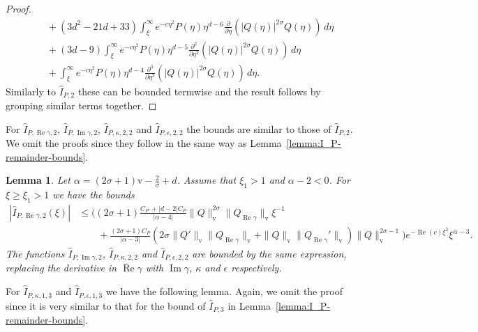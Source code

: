 \documentclass[11pt]{article}
\DeclareMathOperator{\real}{Re}
\DeclareMathOperator{\imag}{Im}
\newcommand{\normv}{\mathrm{v}}
\newtheorem{lemma}[definition]{Lemma}
\begin{document}
\begin{proof}
\begin{align*}
    &\quad + (3d^{2} - 21d + 33)\int_{\xi}^{\infty}e^{-c\eta^{2}}
      P(\eta)\eta^{d - 6}\frac{\partial}{\partial \eta}\left(|Q(\eta)|^{2\sigma}Q(\eta)\right)
      \,d\eta\\
    &\quad + (3d - 9)\int_{\xi}^{\infty}e^{-c\eta^{2}}
      P(\eta)\eta^{d - 5}\frac{\partial^{2}}{\partial \eta^{2}}\left(|Q(\eta)|^{2\sigma}Q(\eta)\right)
      \,d\eta\\
    &\quad + \int_{\xi}^{\infty}e^{-c\eta^{2}}
      P(\eta)\eta^{d - 4}\frac{\partial^{3}}{\partial \eta^{3}}\left(|Q(\eta)|^{2\sigma}Q(\eta)\right)
      \,d\eta.
  \end{align*}
  Similarly to \(\hat{I}_{P,2}\) these can be bounded termwise and the
  result follows by grouping similar terms together.
\end{proof}

For \(\hat{I}_{P,\real\gamma,2}\), \(\hat{I}_{P,\imag\gamma,2}\),
\(\hat{I}_{P,\kappa,2,2}\) and \(\hat{I}_{P,\epsilon,2,2}\) the bounds
are similar to those of \(\hat{I}_{P,2}\). We omit the proofs since
they follow in the same way as Lemma~\ref{lemma:I_P-remainder-bounds}.

\begin{lemma}\label{lemma:I_P-remainder-bounds-1}
  Let \(\alpha = (2\sigma + 1)\normv - \frac{2}{\sigma} + d\). Assume
  that \(\xi_{1} > 1\) and \(\alpha - 2 < 0\). For
  \(\xi \geq \xi_{1} > 1\) we have the bounds
  \begin{align*}
    |\hat{I}_{P,\real\gamma,2}(\xi)|
    &\leq \Bigg(
      (2\sigma + 1)\frac{C_{P'} + |d - 2|C_{P}}{|\alpha - 4|}
      \|Q\|_{\normv}^{2\sigma}\|Q_{\real\gamma}\|_{\normv}\xi^{-1}\\
    &\qquad + \frac{(2\sigma + 1)C_{P}}{|\alpha - 3|}
      (2\sigma\|Q'\|_{\normv}\|Q_{\real\gamma}\|_{\normv} + \|Q\|_{\normv}\|Q_{\real\gamma}'\|_{\normv})\|Q\|_{\normv}^{2\sigma - 1}
      \Bigg)e^{-\real(c)\xi^{2}}\xi^{\alpha - 3}.
  \end{align*}
  The functions \(\hat{I}_{P,\imag\gamma,2}\),
  \(\hat{I}_{P,\kappa,2,2}\) and \(\hat{I}_{P,\epsilon,2,2}\) are
  bounded by the same expression, replacing the derivative in
  \(\real\gamma\) with \(\imag\gamma\), \(\kappa\) and \(\epsilon\)
  respectively.
\end{lemma}

For \(\hat{I}_{P,\kappa,1,3}\) and \(\hat{I}_{P,\epsilon,1,3}\) we
have the following lemma. Again, we omit the proof since it is very
similar to that for the bound of \(\hat{I}_{P,3}\) in
Lemma~\ref{lemma:I_P-remainder-bounds}.
\end{document}
